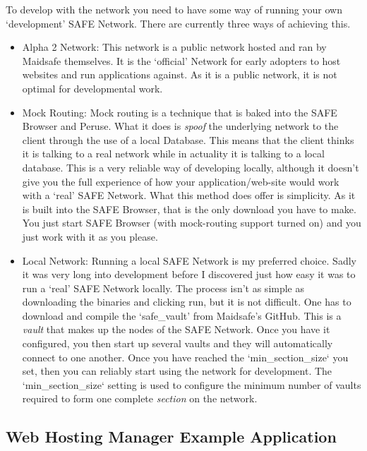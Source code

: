 To develop with the network you need to have some way of running your own `development' SAFE Network. There are currently three ways of achieving this.
\begin{itemize}
	\item Alpha 2 Network: This network is a public network hosted and ran by Maidsafe themselves. It is the `official' Network for early adopters to host websites and run applications against. As it is a public network, it is not optimal for developmental work.
	\item Mock Routing: Mock routing is a technique that is baked into the SAFE Browser and Peruse. What it does is \textit{spoof} the underlying network to the client through the use of a local Database. This means that the client thinks it is talking to a real network while in actuality it is talking to a local database. This is a very reliable way of developing locally, although it doesn't give you the full experience of how your application/web-site would work with a `real' SAFE Network. What this method does offer is simplicity. As it is built into the SAFE Browser, that is the only download you have to make. You just start SAFE Browser (with mock-routing support turned on) and you just work with it as you please.
	\item Local Network: Running a local SAFE Network is my preferred choice. Sadly it was very long into development before I discovered just how easy it was to run a `real' SAFE Network locally. The process isn't as simple as downloading the binaries and clicking run, but it is not difficult. One has to download and compile the `safe\_vault' from Maidsafe's GitHub. This is a \textit{vault} that makes up the nodes of the SAFE Network. Once you have it configured, you then start up several vaults and they will automatically connect to one another. Once you have reached the `min\_section\_size` you set, then you can reliably start using the network for development. The `min\_section\_size` setting is used to configure the minimum number of vaults required to form one complete \textit{section} on the network.
\end{itemize}

\subsection{Web Hosting Manager Example Application}

